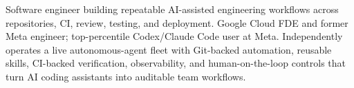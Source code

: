 


Software engineer building repeatable AI-assisted engineering workflows across repositories, CI, review, testing, and deployment. Google Cloud FDE and former Meta engineer; top-percentile Codex/Claude Code user at Meta. Independently operates a live autonomous-agent fleet with Git-backed automation, reusable skills, CI-backed verification, observability, and human-on-the-loop controls that turn AI coding assistants into auditable team workflows.







